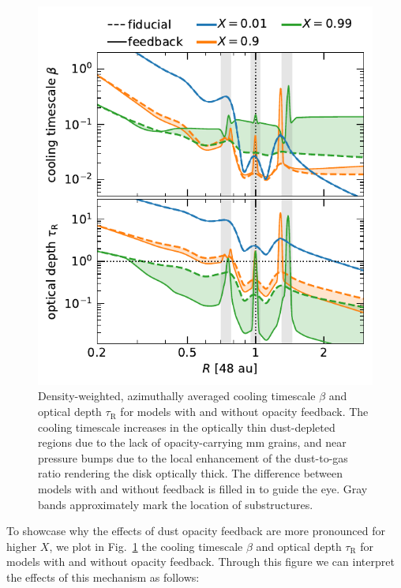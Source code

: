 \documentclass[fleqn,usenatbib,useAMS]{mnras}
\newcommand{\tauR}{\tau_\mathrm{R}}
\begin{document}
\begin{figure}
	\centering
	\includegraphics[width=\columnwidth]{tau-beta-feedback.pdf}
	\caption{Density-weighted, azimuthally averaged cooling timescale $\beta$ and optical depth $\tauR$ for models with and without opacity feedback. The cooling timescale increases in the optically thin dust-depleted regions due to the lack of opacity-carrying mm grains, and near pressure bumps due to the local enhancement of the dust-to-gas ratio rendering the disk optically thick. The difference between models with and without feedback is filled in to guide the eye. Gray bands approximately mark the location of substructures.}
	\label{fig:tau-beta-feedback}
\end{figure}
%
To showcase why the effects of dust opacity feedback are more pronounced for higher $X$, we plot in Fig.~\ref{fig:tau-beta-feedback} the cooling timescale $\beta$ and optical depth $\tauR$ for models with and without opacity feedback. Through this figure we can interpret the effects of this mechanism as follows:
%
\end{document}
